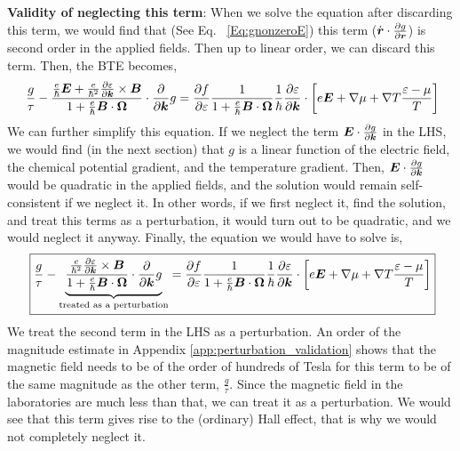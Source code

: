 \documentclass{report}
\renewcommand\vec[1]{\ensuremath\boldsymbol{#1}} %
\begin{document}
\textbf{Validity of neglecting this term}: When we solve the equation after discarding this term, we would find that (See Eq. ~\eqref{Eq:gnonzeroE}) this term ($\dot{\vec{r}} \cdot 
 \frac{\partial{g}}{\partial \vec{r}}$) is second order in the applied fields. Then up to linear order, we can discard this term. Then, the BTE becomes,
\begin{equation}~\label{Eq:BTE_semiFinal_Form}
	\frac{g}{\tau} -\frac{\frac{e}{\hbar} \vec{E} + \frac{e}{\hbar^2} \frac{\partial \varepsilon}{\partial \vec{k}} \times \vec{B}}{1 + \frac{e}{\hbar} \vec{B} \cdot \vec{\Omega}} \cdot\frac{\partial}{\partial \vec{k}} g = \frac{\partial f}{\partial \varepsilon}\frac{1}{1 + \frac{e}{\hbar} \vec{B} \cdot \vec{\Omega}}
	\frac{1}{\hbar} \frac{\partial \varepsilon}{\partial \vec{k}}\cdot\left[e \vec{E} + \nabla{\mu} + \nabla T \frac{\varepsilon - \mu}{T}\right]
\end{equation}
We can further simplify this equation. If we neglect the term $\vec{E} \cdot \frac{\partial g}{\partial \vec{k}}$ in the LHS, we would find (in the next section) that $g$ is a linear function of the electric field, the chemical potential gradient, and the temperature gradient. Then, $\vec{E} \cdot \frac{\partial g}{\partial \vec{k}}$ would be quadratic in the applied fields, and the solution would remain self-consistent if we neglect it. In other words, if we first neglect it, find the solution, and treat this terms as a perturbation, it would turn out to be quadratic, and we would neglect it anyway. Finally, the equation we would have to solve is,
\begin{equation}~\label{Eq:BTE_Final_Form}
	\boxed{\frac{g}{\tau} -\underbrace{\frac{\frac{e}{\hbar^2} \frac{\partial \varepsilon}{\partial \vec{k}} \times \vec{B}}{1 + \frac{e}{\hbar} \vec{B} \cdot \vec{\Omega}} \cdot\frac{\partial}{\partial \vec{k}} g}_{\text{treated as a perturbation}} = \frac{\partial f}{\partial \varepsilon}\frac{1}{1 + \frac{e}{\hbar} \vec{B} \cdot \vec{\Omega}}
	\frac{1}{\hbar} \frac{\partial \varepsilon}{\partial \vec{k}}\cdot\left[e \vec{E} + \nabla{\mu} + \nabla T \frac{\varepsilon - \mu}{T}\right]}
\end{equation}
We treat the second term in the LHS as a perturbation. An order of the magnitude estimate in Appendix \ref{app:perturbation_validation} shows that the magnetic field needs to be of the order of hundreds of Tesla for this term to be of the same magnitude as the other term, $\frac{g}{\tau}$. Since the magnetic field in the laboratories are much less than that, we can treat it as a perturbation. We would see that this term gives rise to the (ordinary) Hall effect, that is why we would not completely neglect it.
\end{document}
